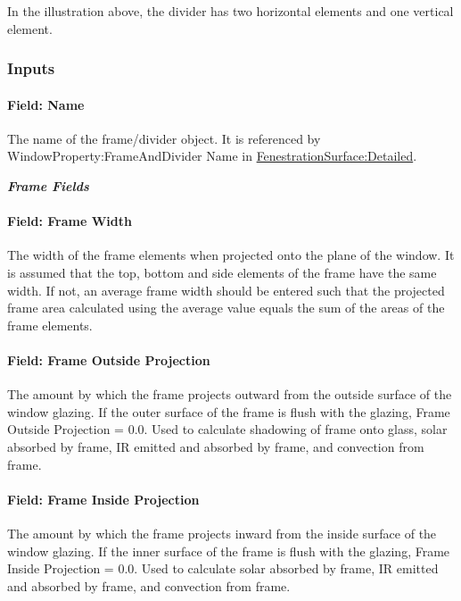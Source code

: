 In the illustration above, the divider has two horizontal elements and one vertical element.

\subsubsection{Inputs}\label{inputs-33-001}

\paragraph{Field: Name}\label{field-name-30-001}

The name of the frame/divider object. It is referenced by WindowProperty:FrameAndDivider Name in \hyperref[fenestrationsurfacedetailed]{FenestrationSurface:Detailed}.

\textbf{\emph{Frame Fields}}

\paragraph{Field: Frame Width}\label{field-frame-width}

The width of the frame elements when projected onto the plane of the window. It is assumed that the top, bottom and side elements of the frame have the same width. If not, an average frame width should be entered such that the projected frame area calculated using the average value equals the sum of the areas of the frame elements.

\paragraph{Field: Frame Outside Projection}\label{field-frame-outside-projection}

The amount by which the frame projects outward from the outside surface of the window glazing. If the outer surface of the frame is flush with the glazing, Frame Outside Projection = 0.0. Used to calculate shadowing of frame onto glass, solar absorbed by frame, IR emitted and absorbed by frame, and convection from frame.

\paragraph{Field: Frame Inside Projection}\label{field-frame-inside-projection}

The amount by which the frame projects inward from the inside surface of the window glazing. If the inner surface of the frame is flush with the glazing, Frame Inside Projection = 0.0. Used to calculate solar absorbed by frame, IR emitted and absorbed by frame, and convection from frame.

